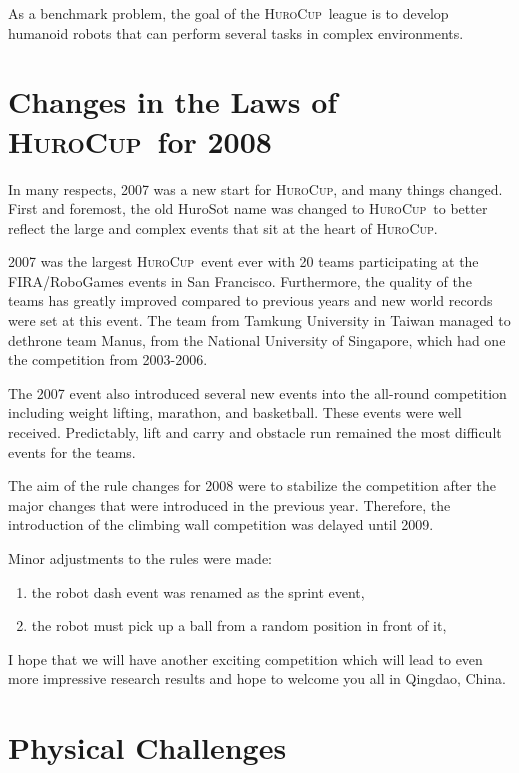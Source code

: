 \documentclass[12pt]{article}
\newcommand{\HuroCup}{\textsc{HuroCup}}
\begin{document}
As a benchmark problem, the goal of the \HuroCup\ league is to develop
humanoid robots that can perform several tasks in complex environments.

\section{Changes in the Laws of \HuroCup\ for 2008}

In many respects, 2007 was a new start for \HuroCup, and many things
changed. First and foremost, the old HuroSot name was changed to
\HuroCup\ to better reflect the large and complex events that sit at
the heart of \HuroCup.

2007 was the largest \HuroCup\ event ever with 20 teams participating
at the FIRA/RoboGames events in San Francisco. Furthermore, the
quality of the teams has greatly improved compared to previous years
and new world records were set at this event. The team from Tamkung
University in Taiwan managed to dethrone team Manus, from the National
University of Singapore, which had one the competition from 2003-2006.

The 2007 event also introduced several new events into the all-round
competition including weight lifting, marathon, and basketball. These
events were well received. Predictably, lift and carry and obstacle
run remained the most difficult events for the teams.

The aim of the rule changes for 2008 were to stabilize the competition
after the major changes that were introduced in the previous
year. Therefore, the introduction of the climbing wall competition was
delayed until 2009. 

Minor adjustments to the rules were made:
\begin{enumerate}
\item the robot dash event was renamed as the sprint event,
\item the robot must pick up a ball from a random position in front of it,
\end{enumerate}

I hope that we will have another exciting competition which will lead
to even more impressive research results and hope to welcome you all
in Qingdao, China.

\section{Physical Challenges}    
\label{sec:physical-challenges}
\end{document}
